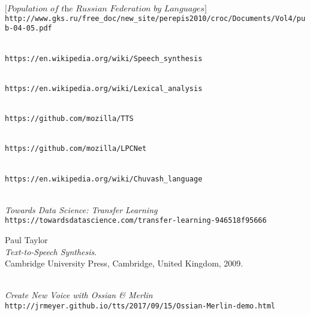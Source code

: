 \documentclass[fleqn,10pt]{SelfArx} %
\begin{document}
\newpage
%
%

\onecolumn

\begin{thebibliography}{9}
\\
$\big[ \textit{Population of the Russian Federation by Languages} \big]$\\
\texttt{http://www.gks.ru/free\_doc/new\_site/perepis2010/croc/Documents/Vol4/pub-04-05.pdf}

\\
\texttt{https://en.wikipedia.org/wiki/Speech\_synthesis}

\\
\texttt{https://en.wikipedia.org/wiki/Lexical\_analysis}

\\
\texttt{https://github.com/mozilla/TTS}

\\
\texttt{https://github.com/mozilla/LPCNet}

\\
\texttt{https://en.wikipedia.org/wiki/Chuvash\_language}

\\
\textit{Towards Data Science: Transfer Learning}\\
\texttt{https://towardsdatascience.com/transfer-learning-946518f95666}

Paul Taylor\\
\textit{Text-to-Speech Synthesis}.\\
Cambridge University Press, Cambridge, United Kingdom, 2009.

\\
\textit{Create New Voice with Ossian \& Merlin}\\
\texttt{http://jrmeyer.github.io/tts/2017/09/15/Ossian-Merlin-demo.html}


\end{thebibliography}
\end{document}
